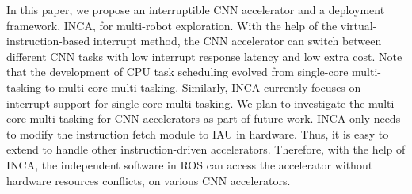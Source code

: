\label{sec:conclusion}

In this paper, we propose an interruptible CNN accelerator and a deployment framework, INCA, for multi-robot exploration. 
With the help of the virtual-instruction-based interrupt method, the CNN accelerator can switch between different CNN tasks with low interrupt response latency and low extra cost. Note that the development of CPU task scheduling evolved from single-core multi-tasking to multi-core multi-tasking. Similarly, INCA currently focuses on interrupt support for single-core multi-tasking. We plan to investigate the multi-core multi-tasking for CNN accelerators as part of future work.
INCA only needs to modify the instruction fetch module to IAU in hardware. Thus, it is easy to extend to handle other instruction-driven accelerators.
Therefore, with the help of INCA, the independent software in ROS can access the accelerator without hardware resources conflicts, on various CNN accelerators.